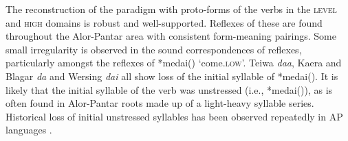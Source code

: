 The reconstruction of the paradigm with proto-forms of the verbs in the \textsc{level} and \textsc{high} domains is robust and well-supported. Reflexes of these are found throughout the Alor-Pantar area with consistent form-meaning pairings. Some small irregularity is observed in the sound correspondences of reflexes, particularly amongst the reflexes of *medai({\ng}) `come.\textsc{low}'. Teiwa \textit{daa}, Kaera and Blagar \textit{da} and Wersing \textit{dai} all show loss of the initial syllable of *medai({\ng}). It is likely that the initial syllable of the verb was unstressed (i.e., *me{\textprimstress}dai({\ng})), as is often found in Alor-Pantar roots made up of a light-heavy syllable series. Historical loss of initial unstressed syllables has been observed repeatedly in AP languages \citep[93, 111]{HoltonEtAl2012}.

 


